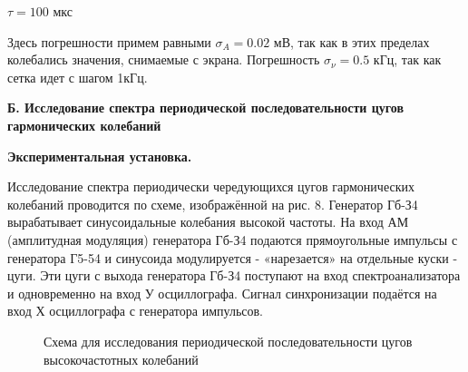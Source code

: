 \documentclass[14pt]{article}
\begin{document}
\vspace{1cm}
$\tau = 100$ мкс

Здесь погрешности примем равными $\sigma_A = 0.02$ мВ, так как в этих пределах колебались значения, снимаемые с экрана. Погрешность $\sigma_\nu = 0.5$ кГц, так как сетка идет с шагом 1кГц. 

\newpage
\textbf{Б. Исследование спектра периодической последовательности цугов гармонических колебаний}

\textbf{Экспериментальная установка.} 

Исследование спектра периодически чередующихся цугов гармонических колебаний проводится по схеме, изображённой на рис. 8. Генератор Гб-З4 вырабатывает синусоидальные колебания высокой частоты. На вход АМ (амплитудная модуляция) генератора Гб-З4 подаются прямоугольные импульсы с генератора Г5-54 и синусоида модулируется - «нарезается» на отдельные куски - цуги. Эти цуги с выхода генератора Гб-З4 поступают на вход спектроанализатора и одновременно на вход У осциллографа. Сигнал синхронизации подаётся на вход Х осциллографа с генератора импульсов.

\begin{figure}[h!]
	\caption{Схема для исследования периодической последовательности цугов высокочастотных колебаний}
	\label{fig:image}
\end{figure}
\end{document}
